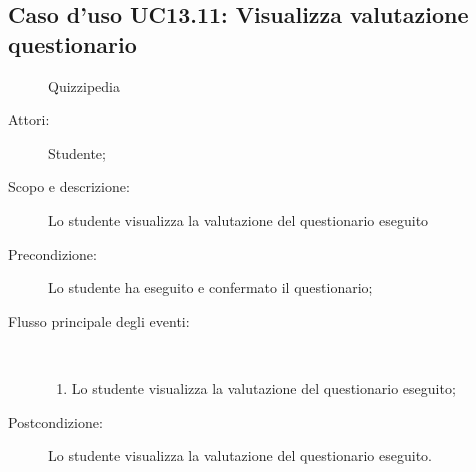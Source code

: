 \subsection{Caso d'uso UC13.11: Visualizza valutazione questionario}
	\begin{figure}[H]
		\centering
		\begin{resizedtikzpicture}{\textwidth}
		\begin{umlsystem}[x=0, fill=lightgray!20]{Quizzipedia}
		\end{umlsystem}
		\end{resizedtikzpicture}
		\caption{}
	\end{figure}
\begin{description}
\item[Attori:] Studente;
\item[Scopo e descrizione:] Lo studente visualizza la valutazione del questionario eseguito
      \item[Precondizione:] Lo studente ha eseguito e confermato il questionario;

        \item[Flusso principale degli eventi:] \ 
 \begin{enumerate}
          \item Lo studente visualizza la valutazione del questionario eseguito;

      \end{enumerate}
    \item[Postcondizione:] Lo studente visualizza la valutazione del questionario eseguito.
  \end{description}
\hypertarget{UC14}{}
